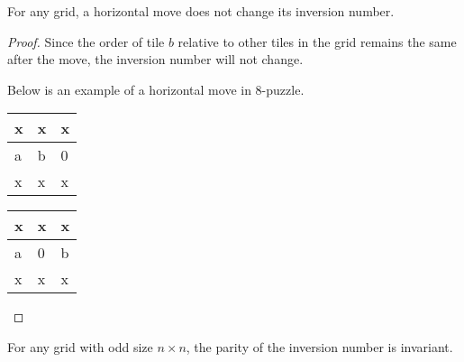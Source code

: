 \documentclass{llncs}
\begin{document}
\begin{lemma}
For any grid, a horizontal move does not change its inversion number.
\end{lemma}

\begin{proof}
Since the order of tile $b$ relative to other tiles in the grid remains the same after the move, the inversion number will not change.

Below is an example of a horizontal move in $8$-puzzle.
\begin{table}
	\centering
	\label{tab1}
	\begin{tabular}{|p{2mm}|p{2mm}|p{2mm}|} \hline
	x & x & x\\ \hline
	a & b & 0\\ \hline
	x & x & x\\ \hline
	\end{tabular}
\end{table}
\begin{table}
	\centering
	\label{tab2}
	\begin{tabular}{|p{2mm}|p{2mm}|p{2mm}|} \hline
	x & x & x\\ \hline
	a & 0 & b\\ \hline
	x & x & x\\ \hline
	\end{tabular}
\end{table}
\end{proof}

\newpage

\begin{lemma}
For any grid with odd size $n \times n$, the parity of the inversion number is invariant.
\end{lemma}
\end{document}
